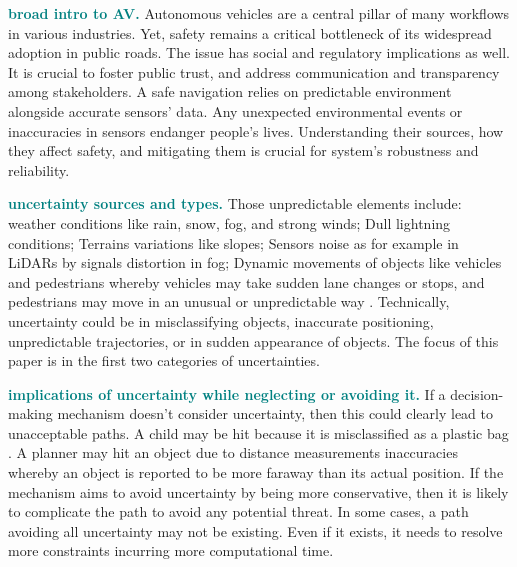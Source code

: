 \textcolor{teal}{\textbf{broad intro to AV.}} Autonomous vehicles are a central pillar of many workflows in various industries. Yet, safety remains a critical bottleneck of its widespread adoption in public roads. The issue has social and regulatory implications as well. It is crucial to foster public trust, and address communication and transparency among stakeholders. A safe navigation relies on predictable environment alongside accurate sensors' data. Any unexpected environmental events or inaccuracies in sensors endanger people's lives. Understanding their sources, how they affect safety, and mitigating them is crucial for system's robustness and reliability.

\textcolor{teal}{\textbf{uncertainty sources and types.}} Those unpredictable elements include: weather conditions like rain, snow, fog, and strong winds; Dull lightning conditions; Terrains variations like slopes; Sensors noise as for example in LiDARs by signals distortion in fog; Dynamic movements of objects like vehicles and pedestrians whereby vehicles may take sudden lane changes or stops, and pedestrians may move in an unusual or unpredictable way \cite{alharbi2020global}. Technically, uncertainty could be in misclassifying objects, inaccurate positioning, unpredictable trajectories, or in sudden appearance of objects. The focus of this paper is in the first two categories of uncertainties.

\textcolor{teal}{\textbf{implications of uncertainty while neglecting or avoiding it.}} If a decision-making mechanism doesn't consider uncertainty, then this could clearly lead to unacceptable paths. A child may be hit because it is misclassified as a plastic bag \cite{tahir2024object}. A planner may hit an object due to distance measurements inaccuracies \cite{itkina2022uncertainty} whereby an object is reported to be more faraway than its actual position. If the mechanism aims to avoid uncertainty by being more conservative, then it is likely to complicate the path to avoid any potential threat. In some cases, a path avoiding all uncertainty may not be existing. Even if it exists, it needs to resolve more constraints incurring more computational time.

